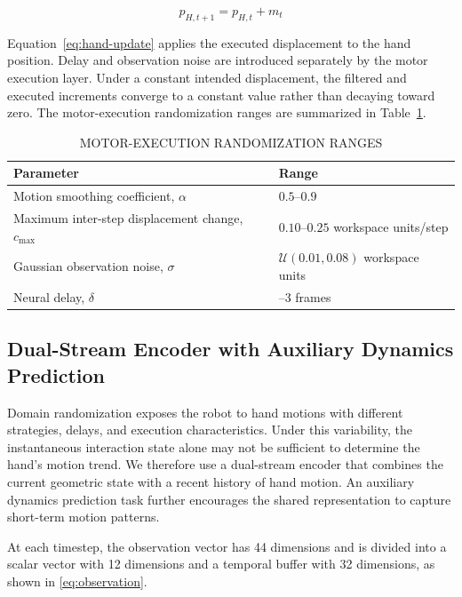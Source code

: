 \documentclass[lettersize,journal]{IEEEtran}
\begin{document}
\begin{equation}
p_{H,t+1} = p_{H,t} + m_t
\label{eq:hand-update}
\end{equation}

Equation~\eqref{eq:hand-update} applies the executed displacement to the hand position. Delay and observation noise are introduced separately by the motor execution layer. Under a constant intended displacement, the filtered and executed increments converge to a constant value rather than decaying toward zero. The motor-execution randomization ranges are summarized in Table~\ref{tab:motor-randomization}.

\begin{table}[!t]
\caption{MOTOR-EXECUTION RANDOMIZATION RANGES}
\label{tab:motor-randomization}
\centering
\footnotesize
\renewcommand{\arraystretch}{1.12}
\begin{tabularx}{0.88\textwidth}{@{}>{\raggedright\arraybackslash}X >{\raggedright\arraybackslash}X@{}}
\toprule
Parameter & Range \\
\midrule
Motion smoothing coefficient, $\alpha$ & $0.5$--$0.9$ \\
Maximum inter-step displacement change, $c_{\max}$ & $0.10$--$0.25$ workspace units/step \\
Gaussian observation noise, $\sigma$ & $\mathcal{U}(0.01,0.08)$ workspace units \\
Neural delay, $\delta$ & 0--3 frames \\
\bottomrule
\end{tabularx}
\end{table}

\subsection{Dual-Stream Encoder with Auxiliary Dynamics Prediction}
\label{subsec:dual-stream-encoder}
Domain randomization exposes the robot to hand motions with different strategies, delays, and execution characteristics. Under this variability, the instantaneous interaction state alone may not be sufficient to determine the hand's motion trend. We therefore use a dual-stream encoder that combines the current geometric state with a recent history of hand motion. An auxiliary dynamics prediction task further encourages the shared representation to capture short-term motion patterns.

At each timestep, the observation vector has 44 dimensions and is divided into a scalar vector with 12 dimensions and a temporal buffer with 32 dimensions, as shown in \eqref{eq:observation}.
\end{document}
